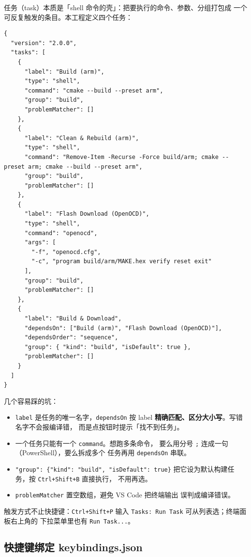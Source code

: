 任务（task）本质是「shell 命令的壳」：把要执行的命令、参数、分组打包成
一个可反复触发的条目。本工程定义四个任务：

\begin{lstlisting}[style=generic]
{
  "version": "2.0.0",
  "tasks": [
    {
      "label": "Build (arm)",
      "type": "shell",
      "command": "cmake --build --preset arm",
      "group": "build",
      "problemMatcher": []
    },
    {
      "label": "Clean & Rebuild (arm)",
      "type": "shell",
      "command": "Remove-Item -Recurse -Force build/arm; cmake --preset arm; cmake --build --preset arm",
      "group": "build",
      "problemMatcher": []
    },
    {
      "label": "Flash Download (OpenOCD)",
      "type": "shell",
      "command": "openocd",
      "args": [
        "-f", "openocd.cfg",
        "-c", "program build/arm/MAKE.hex verify reset exit"
      ],
      "group": "build",
      "problemMatcher": []
    },
    {
      "label": "Build & Download",
      "dependsOn": ["Build (arm)", "Flash Download (OpenOCD)"],
      "dependsOrder": "sequence",
      "group": { "kind": "build", "isDefault": true },
      "problemMatcher": []
    }
  ]
}
\end{lstlisting}

几个容易踩的坑：

\begin{itemize}
  \item \texttt{label} 是任务的唯一名字，\texttt{dependsOn} 按
        label \textbf{精确匹配、区分大小写}。写错名字不会报编译错，
        而是点按钮时提示「找不到任务」。
  \item 一个任务只能有一个 \texttt{command}。想跑多条命令，
        要么用分号 \texttt{;} 连成一句（PowerShell），要么拆成多个
        任务再用 \texttt{dependsOn} 串联。
  \item \texttt{"group": \{"kind": "build", "isDefault": true\}}
        把它设为默认构建任务，按 \texttt{Ctrl+Shift+B} 直接执行，
        不用再选。
  \item \texttt{problemMatcher} 置空数组，避免 VS Code 把终端输出
        误判成编译错误。
\end{itemize}

触发方式不止快捷键：\texttt{Ctrl+Shift+P} 输入
\texttt{Tasks: Run Task} 可从列表选；终端面板右上角的
下拉菜单里也有 \texttt{Run Task...}。

\subsection{快捷键绑定 keybindings.json}

